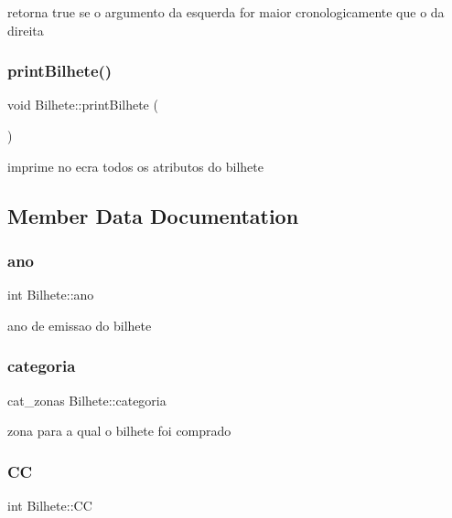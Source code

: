retorna true se o argumento da esquerda for maior cronologicamente que o da direita \mbox{\label{class_bilhete_abae0b23c34a8538b91ea5dbd70606525}} 
\subsubsection{\texorpdfstring{print\+Bilhete()}{printBilhete()}}
{\footnotesize\ttfamily void Bilhete\+::print\+Bilhete (\begin{DoxyParamCaption}{ }\end{DoxyParamCaption})}

imprime no ecra todos os atributos do bilhete 

\subsection{Member Data Documentation}
\mbox{\label{class_bilhete_a28c57c28b91d9d751cb8292911af4b00}} 
\subsubsection{\texorpdfstring{ano}{ano}}
{\footnotesize\ttfamily int Bilhete\+::ano\hspace{0.3cm}{\ttfamily [protected]}}

ano de emissao do bilhete \mbox{\label{class_bilhete_a964746f80b1342fc53512073b5588c1a}} 
\subsubsection{\texorpdfstring{categoria}{categoria}}
{\footnotesize\ttfamily cat\+\_\+zonas Bilhete\+::categoria\hspace{0.3cm}{\ttfamily [protected]}}

zona para a qual o bilhete foi comprado \mbox{\label{class_bilhete_a3272957b6efbae819c70320b40823e46}} 
\subsubsection{\texorpdfstring{CC}{CC}}
{\footnotesize\ttfamily int Bilhete\+::\+CC\hspace{0.3cm}{\ttfamily [protected]}}

